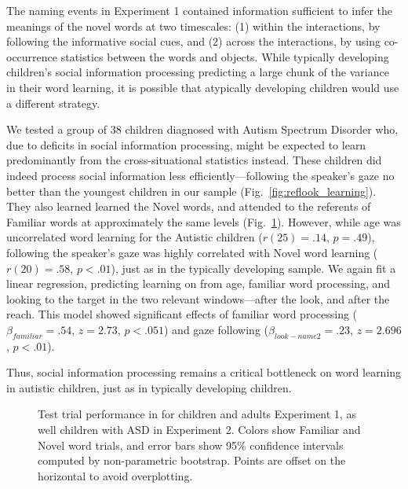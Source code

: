 \documentclass{pnastwo}
\begin{document}
\begin{article}
The naming events in Experiment 1 contained information sufficient to infer the meanings of the novel words at two timescales: (1) within the interactions, by following the informative social cues, and (2) across the interactions, by using co-occurrence statistics between the words and objects. While typically developing children's social information processing predicting a large chunk of the variance in their word learning, it is possible that atypically developing children would use a different strategy.

We tested a group of 38 children diagnosed with Autism Spectrum Disorder who, due to deficits in social information processing, might be expected to learn predominantly from the cross-situational statistics instead. These children did indeed process social information less efficiently---following the speaker's gaze no better than the youngest children in our sample (Fig.~\ref{fig:reflook_learning}). They also learned learned the Novel words, and attended to the referents of Familiar words at approximately the same levels (Fig.~\ref{fig:reflook_test}). However, while age was uncorrelated  word learning for the Autistic children ($r(25) = .14$, $p =.49$), following the speaker's gaze was highly correlated with Novel word learning ($r(20) = .58$, $p <.01$), just as in the typically developing sample. We again fit a linear regression, predicting learning on from age, familiar word processing, and looking to the target in the two relevant windows---after the look, and after the reach. This model showed significant effects of familiar word processing ($\beta_{familiar} = .54$, $z = 2.73$, $p < . 051$) and gaze following  ($\beta_{look-name2} = .23$, $z = 2.696$, $p < .01$).

Thus, social information processing remains a critical bottleneck on word learning in autistic children, just as in typically developing children.


\begin{figure}[tb]
	\caption{\label{fig:reflook_test} Test trial performance in for children and adults Experiment 1, as well children with ASD in Experiment 2. Colors show Familiar and Novel word trials, and error bars show 95\% confidence intervals computed by non-parametric bootstrap. Points are offset on the horizontal to avoid overplotting.}
\end{figure}


\end{article}
\end{document}
